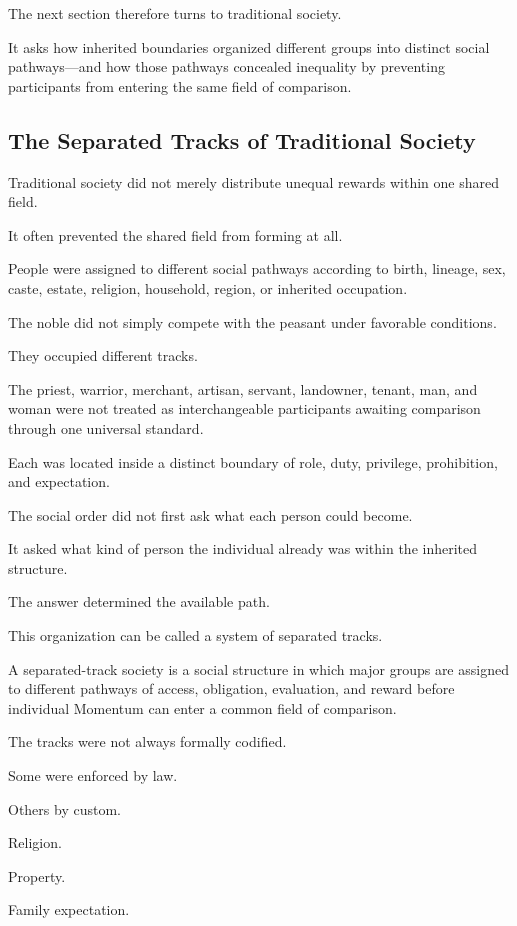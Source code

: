 The next section therefore turns to traditional society.

It asks how inherited boundaries organized different groups into distinct social pathways—and how those pathways concealed inequality by preventing participants from entering the same field of comparison.

\subsection*{\textbf{The Separated Tracks of Traditional Society}}


Traditional society did not merely distribute unequal rewards within one shared field.

It often prevented the shared field from forming at all.

People were assigned to different social pathways according to birth, lineage, sex, caste, estate, religion, household, region, or inherited occupation.

The noble did not simply compete with the peasant under favorable conditions.

They occupied different tracks.

The priest, warrior, merchant, artisan, servant, landowner, tenant, man, and woman were not treated as interchangeable participants awaiting comparison through one universal standard.

Each was located inside a distinct boundary of role, duty, privilege, prohibition, and expectation.

The social order did not first ask what each person could become.

It asked what kind of person the individual already was within the inherited structure.

The answer determined the available path.

This organization can be called a system of separated tracks.

A separated-track society is a social structure in which major groups are assigned to different pathways of access, obligation, evaluation, and reward before individual Momentum can enter a common field of comparison.

The tracks were not always formally codified.

Some were enforced by law.

Others by custom.

Religion.

Property.

Family expectation.

